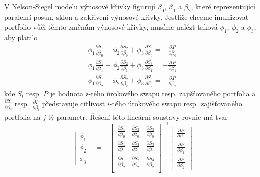 \documentclass[a4paper]{book}
\begin{document}
V Nelson-Siegel modelu výnosové křivky figurují $\beta_0$, $\beta_1$ a $\beta_2$, které reprezentující paralelní posun, sklon a zakřivení výnosové křivky. Jestliže chceme imunizovat portfolio vůči těmto změnám výnosové křivky, musíme nalézt taková $\phi_1$, $\phi_2$ a $\phi_3$, aby platilo
\begin{gather*}
\phi_1 \frac{\partial S_1}{\partial \beta_0} + \phi_2 \frac{\partial S_2}{\partial \beta_0} + \phi_3 \frac{\partial S_3}{\partial \beta_0} = - \frac{\partial P}{\partial \beta_0}\\
\phi_1 \frac{\partial S_1}{\partial \beta_1} + \phi_2 \frac{\partial S_2}{\partial \beta_1} + \phi_3 \frac{\partial S_3}{\partial \beta_1} = - \frac{\partial P}{\partial \beta_1}\\
\phi_1 \frac{\partial S_1}{\partial \beta_2} + \phi_2 \frac{\partial S_2}{\partial \beta_2} + \phi_3 \frac{\partial S_3}{\partial \beta_2} = - \frac{\partial P}{\partial \beta_2}
\end{gather*}
kde $S_i$ resp. $P$ je hodnota $i$-tého úrokového swapu resp. zajišťovaného portfolia a $\frac{\partial S_i}{\partial \beta_j}$ resp. $\frac{\partial P}{\partial \beta_i}$ představuje citlivost $i$-tého úrokového swapu resp. zajišťovaného portfolia na $j$-tý parametr. Řešení této lineární soustavy rovnic má tvar
\begin{equation*}
\begin{bmatrix}
\phi_1 \\
\phi_2 \\
\phi_3
\end{bmatrix}
=
-
\begin{bmatrix}
\frac{\partial S_1}{\partial \beta_0} & \frac{\partial S_2}{\partial \beta_0} & \frac{\partial S_3}{\partial \beta_0}\\
\frac{\partial S_1}{\partial \beta_1} & \frac{\partial S_2}{\partial \beta_1} & \frac{\partial S_3}{\partial \beta_1}\\
\frac{\partial S_1}{\partial \beta_2} & \frac{\partial S_2}{\partial \beta_2} & \frac{\partial S_3}{\partial \beta_2}\\
\end{bmatrix}^{-1}
\begin{bmatrix}
\frac{\partial P}{\partial \beta_0} \\
\frac{\partial P}{\partial \beta_1} \\
\frac{\partial P}{\partial \beta_2}
\end{bmatrix}
\end{equation*}
\end{document}
